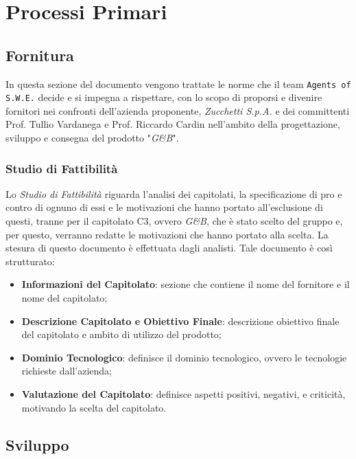 \section{Processi Primari}\label{ProcessiPrimari}

\subsection{Fornitura}\label{Fornitura}
In questa sezione del documento vengono trattate le norme che il team \texttt{Agents of S.W.E.} decide e si impegna a rispettare, con lo scopo di proporsi e divenire fornitori nei confronti dell'azienda proponente, \textit{Zucchetti S.p.A.} e dei committenti Prof. Tullio Vardanega e Prof. Riccardo Cardin nell'ambito della progettazione, sviluppo e consegna del prodotto "\textit{G\&B}".
\subsubsection{Studio di Fattibilità} \label{ProcessiPrimari_Sviluppo_StudioFattibilità}
Lo \textit{Studio di Fattibilità} riguarda l'analisi dei capitolati, la specificazione di pro e contro di ognuno di essi e le motivazioni che hanno portato all'esclusione di questi, tranne per il capitolato C3, ovvero \textit{G\&B}, che è stato scelto del gruppo e, per questo, verranno redatte le motivazioni che hanno portato alla scelta. La stesura di questo documento è effettuata dagli analisti.
Tale documento è così strutturato:
\begin{itemize}
	\item \textbf{Informazioni del Capitolato}: sezione che contiene il nome del fornitore e il nome del capitolato;
	\item \textbf{Descrizione Capitolato e Obiettivo Finale}: descrizione obiettivo finale del capitolato e ambito di utilizzo del prodotto;
	\item \textbf{Dominio Tecnologico}: definisce il dominio tecnologico, ovvero le tecnologie richieste dall'azienda;
	\item \textbf{Valutazione del Capitolato}: definisce aspetti positivi, negativi, e criticità, motivando la scelta del capitolato.
\end{itemize}

\subsection{Sviluppo}\label{Sviluppo}

